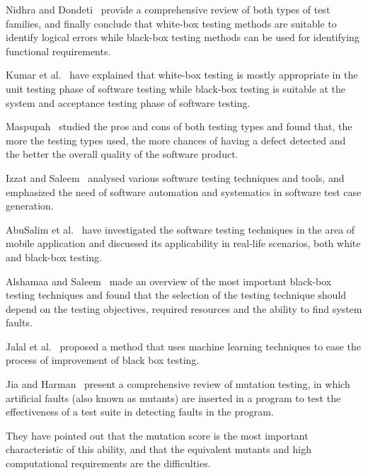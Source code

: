 \documentclass[conference]{IEEEtran}
\begin{document}
Nidhra and Dondeti~\cite{nidhra2012} provide a comprehensive review of both types of test families, and finally conclude that white-box testing methods are suitable to identify logical errors while black-box testing methods can be used for identifying functional requirements.



Kumar et al.~\cite{kumar2015} have explained that white-box testing is mostly appropriate in the unit testing phase of software testing while black-box testing is suitable at the system and acceptance testing phase of software testing.



Maspupah~\cite{maspupah2025} studied the pros and cons of both testing types and found that, the more the testing types used, the more chances of having a defect detected and the better the overall quality of the software product.



Izzat and Saleem~\cite{izzat2023} analysed various software testing techniques and tools, and emphasized the need of software automation and systematics in software test case generation.



AbuSalim et al.~\cite{abuslim2021} have investigated the software testing techniques in the area of mobile application and discussed its applicability in real-life scenarios, both white and black-box testing.



Alshamaa and Saleem~\cite{alshamaa2025} made an overview of the most important black-box testing techniques and found that the selection of the testing technique should depend on the testing objectives, required resources and the ability to find system faults.



Jalal et al.~\cite{jalal2026} proposed a method that uses machine learning techniques to ease the process of improvement of black box testing.



Jia and Harman~\cite{jia2011} present a comprehensive review of mutation testing, in which artificial faults (also known as mutants) are inserted in a program to test the effectiveness of a test suite in detecting faults in the program.

They have pointed out that the mutation score is the most important characteristic of this ability, and that the equivalent mutants and high computational requirements are the difficulties.
\end{document}
